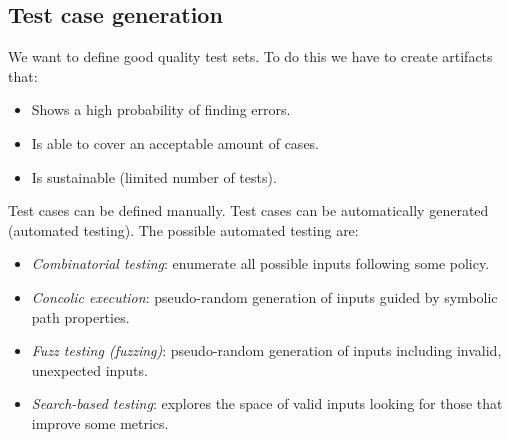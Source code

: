 \subsection{Test case generation}
We want to define good quality test sets. 
To do this we have to create artifacts that: 
\begin{itemize}
    \item Shows a high probability of finding errors. 
    \item Is able to cover an acceptable amount of cases. 
    \item Is sustainable (limited number of tests). 
\end{itemize}
Test cases can be defined manually. 
Test cases can be automatically generated (automated testing). 
The possible automated testing are: 
\begin{itemize}
    \item \textit{Combinatorial testing}: enumerate all possible inputs following some policy. 
    \item \textit{Concolic execution}: pseudo-random generation of inputs guided by symbolic path properties. 
    \item \textit{Fuzz testing (fuzzing)}: pseudo-random generation of inputs including invalid, unexpected inputs. 
    \item \textit{Search-based testing}: explores the space of valid inputs looking for those that improve some metrics. 
\end{itemize}

